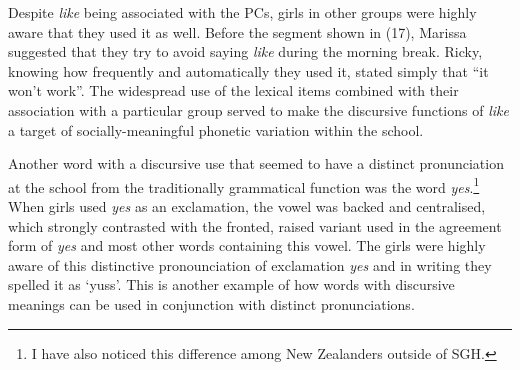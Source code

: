 Despite \textit{like} being associated with the PCs, girls in other groups were highly aware that they used it as well.  Before the segment shown in (17), Marissa suggested that they try to avoid saying \textit{like} during the morning break.  Ricky, knowing how frequently and automatically they used it, stated simply that ``it won't work''.  The widespread use of the lexical items combined with their association with a particular group served to make the discursive functions of \textit{like} a target of socially-meaningful phonetic variation within the school.





Another word with a discursive use that seemed to have a distinct pronunciation at the school from the traditionally grammatical function was the word \textit{yes}.\footnote{I have also noticed this difference among New Zealanders outside of SGH.}  When girls used \textit{yes} as an exclamation, the vowel was backed and centralised, which strongly contrasted with the fronted, raised variant used in the agreement form of \textit{yes} and most other words containing this vowel.  The girls were highly aware of this distinctive pronounciation of exclamation \textit{yes} and in writing they spelled it as `yuss'.  This is another example of how words with discursive meanings can be used in conjunction with distinct pronunciations.


